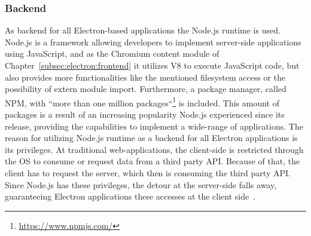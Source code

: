 \subsubsection{Backend}
\label{subsec:electron:backend}
As backend for all Electron-based applications the Node.js runtime is used.
Node.js is a framework allowing developers to implement server-side applications using JavaScript, and as the Chromium content module of Chapter~\ref{subsec:electron:frontend} it utilizes V8 to execute JavaScript code, but also provides more functionalities like the mentioned filesystem access or the possibility of extern module import.
Furthermore, a pack\-age manager, called \ac{NPM}, with ``more than one million packages``\footnote{\url{https://www.npmjs.com/}} is included.
This amount of packages is a result of an increasing popularity Node.js experienced since its release, providing the capabilities to implement a wide-range of applications.
The reason for utilizing Node.js runtime as a backend for all Electron applications is its privileges.
At traditional web-applications, the client-side is restricted through the \ac{OS} to consume or request data from a third party \ac{API}\@.
Because of that, the client has to request the server, which then is consuming the third party \ac{API}\@.
Since Node.js has these privileges, the detour at the server-side falls away, guaranteeing Electron applications these accesses at the client side~\cite{electron-in-action, electron-nwjs}.


